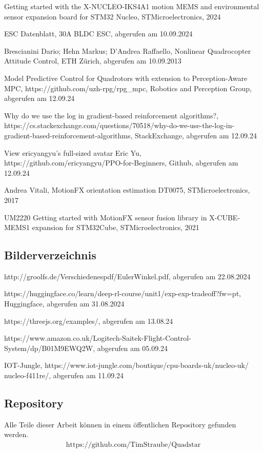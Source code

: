 \begin{enumerate}[label=\textbf{[\arabic*]}]
	\item \label{link:34} Getting started with the X-NUCLEO-IKS4A1 motion MEMS and environmental sensor expansion board for STM32 Nucleo, STMicroelectronics, 2024
	\item \label{link:Treiberdatenblatt}ESC Datenblatt, 30A BLDC ESC, abgerufen am 10.09.2024 
	\item \label{link:ETH}Brescianini Dario; Hehn Markus; D'Andrea Raffaello, Nonlinear Quadrocopter Attitude Control, ETH Zürich, abgerufen am 10.09.2013 
	\item \label{link:MPC} Model Predictive Control for Quadrotors with extension to Perception-Aware MPC, https://github.com/uzh-rpg/rpg\_mpc, Robotics and Perception Group, abgerufen am 12.09.24
	\item \label{link:LogPPO} Why do we use the log in gradient-based reinforcement algorithms?,\\ https://cs.stackexchange.com/questions/70518/why-do-we-use-the-log-in-gradient-based-reinforcement-algorithms, StackExchange, abgerufen am 12.09.24
	\item \label{link:PPOBeginner}View ericyangyu's full-sized avatar Eric Yu, https://github.com/ericyangyu/PPO-for-Beginners, Github, abgerufen am 12.09.24
	\item \label{link:MotionFX}Andrea Vitali, MotionFX orientation estimation DT0075, STMicroelectronics, 2017
	\item \label{X-CUBE-MEMS1} UM2220 Getting started with MotionFX sensor fusion library in X-CUBE-MEMS1
	expansion for STM32Cube, STMicroelectronics, 2021
\end{enumerate}

\subsection{Bilderverzeichnis}
\begin{enumerate}[label=\textbf{[\arabic*]}]
	\item \label{bild:1} http://groolfs.de/Verschiedenespdf/EulerWinkel.pdf, abgerufen am 22.08.2024
	\item \label{bild:2} https://huggingface.co/learn/deep-rl-course/unit1/exp-exp-tradeoff?fw=pt, Huggingface, abgerufen am 31.08.2024
	\item \label{bild:3} https://threejs.org/examples/, abgerufen am 13.08.24
	\item \label{bild:4} https://www.amazon.co.uk/Logitech-Saitek-Flight-Control-System/dp/B01M9EWQ2W, abgerufen am 05.09.24
	\item \label{bild:Pinout} IOT-Jungle, https://www.iot-jungle.com/boutique/cpu-boards-uk/nucleo-uk/\\nucleo-f411re/, abgerufen am 11.09.24
\end{enumerate}

\subsection{Repository}
Alle Teile dieser Arbeit können in einem öffentlichen Repository gefunden werden. 
\begin{align*}
	\text{https://github.com/TimStraube/Quadstar}
\end{align*}